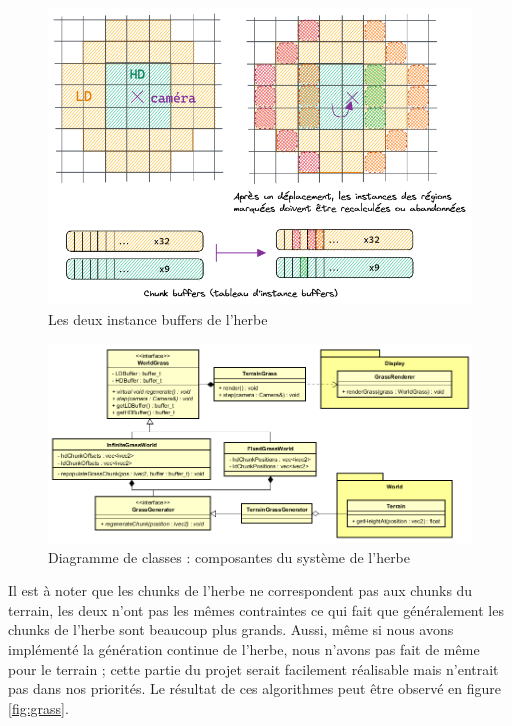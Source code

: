\documentclass{EPUProjetDi}
\begin{document}
\begin{figure}[H]
	\centering
	\includegraphics[scale=.49]{grass_instance_buffers}
	\caption{Les deux instance buffers de l'herbe}
	\label{fig:grass_instance_buffers}
\end{figure}

\begin{figure}[H]
	\centering
	\includegraphics[scale=.49]{grass_uml}
	\caption{Diagramme de classes : composantes du système de l'herbe}
\end{figure}

Il est à noter que les chunks de l'herbe ne correspondent pas aux chunks du terrain, les deux n'ont pas les mêmes contraintes ce qui fait que généralement les chunks de l'herbe sont beaucoup plus grands. Aussi, même si nous avons implémenté la génération continue de l'herbe, nous n'avons pas fait de même pour le terrain ; cette partie du projet serait facilement réalisable mais n'entrait pas dans nos priorités. Le résultat de ces algorithmes peut être observé en figure \ref{fig:grass}.
\end{document}
